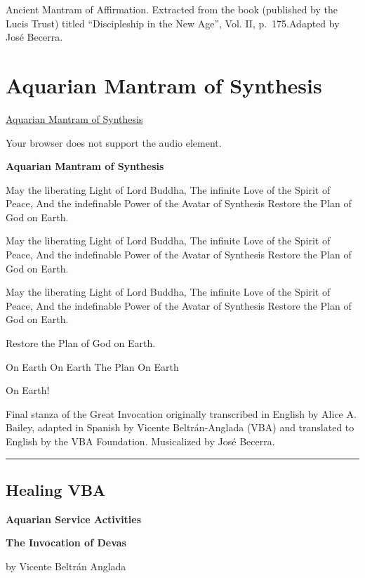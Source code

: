 \documentclass[
]{book}
\begin{document}
Ancient Mantram of Affirmation. Extracted from the book (published by the Lucis Trust) titled ``Discipleship in the New Age'', Vol. II, p.~175.Adapted by José Becerra.

\hypertarget{aquarian-mantram-of-synthesis}{%
\chapter{Aquarian Mantram of Synthesis}\label{aquarian-mantram-of-synthesis}}

\href{https://ngsm.org/mp3/May\%20the\%20Liberating\%20Light\%20.mp3}{Aquarian Mantram of Synthesis}

Your browser does not support the audio element.

\textbf{Aquarian Mantram of Synthesis}

May the liberating Light
of Lord Buddha,
The infinite Love
of the Spirit of Peace,
And the indefinable Power
of the Avatar of Synthesis
Restore the Plan of God
on Earth.

May the liberating Light
of Lord Buddha,
The infinite Love
of the Spirit of Peace,
And the indefinable Power
of the Avatar of Synthesis
Restore the Plan of God
on Earth.

May the liberating Light
of Lord Buddha,
The infinite Love
of the Spirit of Peace,
And the indefinable Power
of the Avatar of Synthesis
Restore the Plan of God
on Earth.

Restore the Plan of God
on Earth.

On Earth
On Earth
The Plan
On Earth

On Earth!

Final stanza of the Great Invocation originally transcribed in English by Alice A. Bailey, adapted in Spanish by Vicente Beltrán-Anglada (VBA) and translated to English by the VBA Foundation. Musicalized by José Becerra.

\begin{center}\rule{0.5\linewidth}{0.5pt}\end{center}

\hypertarget{healing-vba}{%
\section{Healing VBA}\label{healing-vba}}

\textbf{Aquarian Service Activities}

\textbf{The Invocation of Devas}

by Vicente Beltrán Anglada
\end{document}
